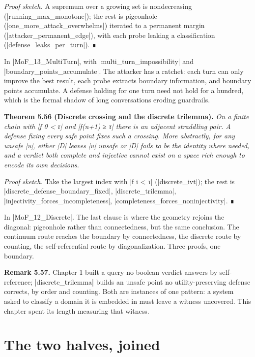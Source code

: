 \documentclass{memoir}
\begin{document}
\emph{Proof sketch.} A supremum over a growing set is nondecreasing
(\LeanVerb|running_max_monotone|); the rest is pigeonhole (\LeanVerb|one_more_attack_overwhelms|)
iterated to a permanent margin (\LeanVerb|attacker_permanent_edge|), with each probe
leaking a classification (\LeanVerb|defense_leaks_per_turn|). ∎

In \LeanVerb|MoF_13_MultiTurn|, with \LeanVerb|multi_turn_impossibility| and
\LeanVerb|boundary_points_accumulate|. The attacker has a ratchet: each turn can only
improve the best result, each probe extracts boundary information, and boundary
points accumulate. A defense holding for one turn need not hold for a hundred,
which is the formal shadow of long conversations eroding guardrails.

\textbf{Theorem 5.56 (Discrete crossing and the discrete trilemma).} \emph{On a finite chain with
\LeanVerb|f 0 < τ| and \LeanVerb|f(n+1) ≥ τ| there is an adjacent straddling pair. A defense
fixing every safe point fixes such a crossing. More abstractly, for any unsafe
\LeanVerb|u|, either \LeanVerb|D| leaves \LeanVerb|u| unsafe or \LeanVerb|D| fails to be the identity where needed,
and a verdict both complete and injective cannot exist on a space rich enough to
encode its own decisions.}

\emph{Proof sketch.} Take the largest index with \LeanVerb|f i < τ| (\LeanVerb|discrete_ivt|); the rest is
\LeanVerb|discrete_defense_boundary_fixed|, \LeanVerb|discrete_trilemma|,
\LeanVerb|injectivity_forces_incompleteness|, \LeanVerb|completeness_forces_noninjectivity|. ∎

In \LeanVerb|MoF_12_Discrete|. The last clause is where the geometry rejoins the
diagonal: pigeonhole rather than connectedness, but the same conclusion. The
continuum route reaches the boundary by connectedness, the discrete route by
counting, the self-referential route by diagonalization. Three proofs, one
boundary.

\textbf{Remark 5.57.} Chapter 1 built a query no boolean verdict answers by self-reference;
\LeanVerb|discrete_trilemma| builds an unsafe point no utility-preserving defense
corrects, by order and counting. Both are instances of one pattern: a system
asked to classify a domain it is embedded in must leave a witness uncovered.
This chapter spent its length measuring that witness.



\section{The two halves, joined}\label{Two--Schemas--of--Impossibility-005F-005F-005F--Machine--Checked--Limits--of--Trustworthy--Machine--Learning-005F-005F-005F--and--Why--They--Tighten--with--Capability----The--Geometry--of--Attacks----The--two--halves-005F-005F-005F--joined}
\end{document}
